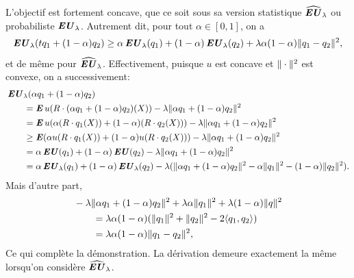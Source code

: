 \begin{lemme}
  L'objectif est fortement concave, que ce soit sous sa version statistique $\operatorname{\widehat{\operatorname{\mbox{\textbf{\textit{EU}}}}}}_\lambda$ ou
  probabiliste $\operatorname{\mbox{\textbf{\textit{EU}}}}_\lambda$. Autrement dit, pour tout $\alpha \in [0,1]$, on a
  \begin{equation}
    \operatorname{\mbox{\textbf{\textit{EU}}}}_\lambda(tq_1 + (1-\alpha )q_2) \geq \alpha \operatorname{\mbox{\textbf{\textit{EU}}}}_\lambda(q_1) + (1-\alpha)\operatorname{\mbox{\textbf{\textit{EU}}}}_\lambda(q_2) + \lambda \alpha(1-\alpha)\|q_1-q_2\|^2,
  \end{equation}
  et de même pour $\operatorname{\widehat{\operatorname{\mbox{\textbf{\textit{EU}}}}}}_\lambda$. Effectivement, puisque $u$ est concave et $\|\cdot\|^2$ est
  convexe, on a successivement:
  \begin{align}
    & \operatorname{\mbox{\textbf{\textit{EU}}}}_\lambda(\alpha q_1 + (1-\alpha )q_2)\\
    &\qquad= \operatorname{\mbox{\textbf{\textit{E}}}} u(R\cdot (\alpha q_1+(1-\alpha )q_2)(X)) - \lambda\|\alpha q_1 + (1-\alpha)q_2\|^2\\
    &\qquad= \operatorname{\mbox{\textbf{\textit{E}}}} u(\alpha (R\cdot q_1(X)) + (1-\alpha )(R\cdot q_2(X)))- \lambda\|\alpha q_1 + (1-\alpha)q_2\|^2\\
    &\qquad\geq \operatorname{\mbox{\textbf{\textit{E}}}}(\alpha  u(R\cdot q_1(X)) + (1-\alpha )u(R\cdot q_2(X))) - \lambda\|\alpha q_1 + (1-\alpha)q_2\|^2\\
    &\qquad= \alpha\operatorname{\mbox{\textbf{\textit{EU}}}}(q_1) + (1-\alpha)\operatorname{\mbox{\textbf{\textit{EU}}}}(q_2) - \lambda\|\alpha q_1 + (1-\alpha)q_2\|^2\\
    &\qquad= \alpha\operatorname{\mbox{\textbf{\textit{EU}}}}_\lambda(q_1) + (1-\alpha)\operatorname{\mbox{\textbf{\textit{EU}}}}_\lambda(q_2) - \lambda(\|\alpha q_1+(1-\alpha)q_2\|^2 - \alpha\|q_1\|^2 -
      (1-\alpha)\|q_2\|^2).
  \end{align}
  Mais d'autre part,
  \begin{align}
    &-\lambda\|\alpha q_1 + (1-\alpha)q_2\|^2 + \lambda\alpha\|q_1\|^2+\lambda(1-\alpha)\|q\|^2\\
    &\qquad = \lambda\alpha(1-\alpha)(\|q_1\|^2 + \|q_2\|^2 - 2\langle q_1,q_2\rangle)\\
    &\qquad = \lambda\alpha(1-\alpha)\|q_1-q_2\|^2,
  \end{align}
  Ce qui complète la démonstration. La dérivation demeure exactement la même lorsqu'on
  considère $\operatorname{\widehat{\operatorname{\mbox{\textbf{\textit{EU}}}}}}_\lambda$.
\end{lemme}



